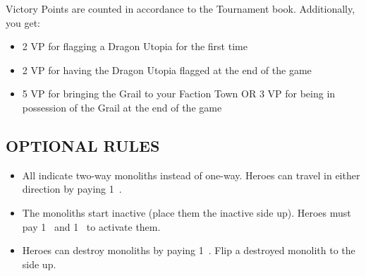 \begin{multicols}{2}
Victory Points are counted in accordance to the Tournament book. Additionally, you get:
\begin{itemize}
  \item 2 VP for flagging a Dragon Utopia for the first time
  \item 2 VP for having the Dragon Utopia flagged at the end of the game
  \item 5 VP for bringing the Grail to your Faction Town OR 3 VP for being in possession of the Grail at the end of the game
\end{itemize}

\subsection*{\MakeUppercase{Optional Rules}}
\begin{itemize}
  \item All  indicate two-way monoliths instead of one-way.
    Heroes can travel in either direction by paying 1~.
  \item The monoliths start inactive (place them the inactive  side up).
    Heroes must pay 1~ and 1~ to activate them.
  \item Heroes can destroy monoliths by paying 1~.
    Flip a destroyed monolith to the  side up.
\end{itemize}

\end{multicols}

\vspace*{-8em}

